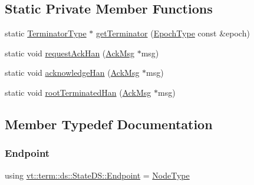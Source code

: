 \subsection*{Static Private Member Functions}
\begin{DoxyCompactItemize}
\item 
static \hyperlink{structvt_1_1term_1_1ds_1_1_state_d_s_af98cfe31c25f710273ee103026d538e4}{Terminator\+Type} $\ast$ \hyperlink{structvt_1_1term_1_1ds_1_1_state_d_s_a291452cba8050d7a5e377b1e86c3f42a}{get\+Terminator} (\hyperlink{namespacevt_a985a5adf291c34a3ca263b3378388236}{Epoch\+Type} const \&epoch)
\item 
static void \hyperlink{structvt_1_1term_1_1ds_1_1_state_d_s_a495c3114bf861786f7b5bcb6f57941dc}{request\+Ack\+Han} (\hyperlink{structvt_1_1term_1_1ds_1_1_ack_msg}{Ack\+Msg} $\ast$msg)
\item 
static void \hyperlink{structvt_1_1term_1_1ds_1_1_state_d_s_ab23731c48967204f38d54e2241952b9f}{acknowledge\+Han} (\hyperlink{structvt_1_1term_1_1ds_1_1_ack_msg}{Ack\+Msg} $\ast$msg)
\item 
static void \hyperlink{structvt_1_1term_1_1ds_1_1_state_d_s_ac18e56eb23a88586bbf9e61023ec1ec9}{root\+Terminated\+Han} (\hyperlink{structvt_1_1term_1_1ds_1_1_ack_msg}{Ack\+Msg} $\ast$msg)
\end{DoxyCompactItemize}


\subsection{Member Typedef Documentation}
\mbox{\label{structvt_1_1term_1_1ds_1_1_state_d_s_aba302de614dd639f5d93f4f5b6dd6108}} 
\subsubsection{\texorpdfstring{Endpoint}{Endpoint}}
{\footnotesize\ttfamily using \hyperlink{structvt_1_1term_1_1ds_1_1_state_d_s_aba302de614dd639f5d93f4f5b6dd6108}{vt\+::term\+::ds\+::\+State\+D\+S\+::\+Endpoint} =  \hyperlink{namespacevt_a866da9d0efc19c0a1ce79e9e492f47e2}{Node\+Type}}

\mbox{\label{structvt_1_1term_1_1ds_1_1_state_d_s_af98cfe31c25f710273ee103026d538e4}} 
